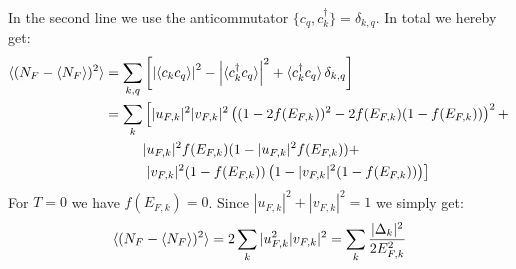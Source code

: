In the second line we use the anticommutator $\{c_q, c^\dagger_k\} = \delta_{k,q}$. In total we hereby get:
\begin{align}
\braket{(N_F-{\braket{N_F}})^2} = \sum_{k,q} & \left[\left|\braket{c_kc_q}\right|^2 - \left|\braket{c^\dagger_kc_q}\right|^2 + \braket{c^\dagger_k c_q}\delta_{k,q} \right] \nonumber \\
=\sum_k & \left[ |u_{F,k}|^2|v_{F,k}|^2\left( (1 - 2f(E_{F,k}))^2 - 2f(E_{F,k})(1 - f(E_{F,k})) \right)^2  + \right. \nonumber \\
& |u_{F,k}|^2f(E_{F,k})(1 - |u_{F,k}|^2f(E_{F,k})) + \nonumber \\
&\left. |v_{F,k}|^2 ( 1 - f(E_{F,k}) )\left(1  - |v_{F,k}|^2 (1 - f(E_{F,k})) \right) \right]
\label{eq.VarianceNFgeneralT}
\end{align}
For $T = 0$ we have $f(E_{F,k}) = 0$. Since $|u_{F,k}|^2 + |v_{F,k}|^2 = 1$ we simply get:
\begin{equation}
\braket{(N_F-{\braket{N_F}})^2} = 2\sum_k |u_{F,k}^2|v_{F,k}|^2 = \sum_k \frac{|\Delta_k|^2}{2E^2_{F,k}}
\label{eq.VarianceNFT0}
\end{equation}

